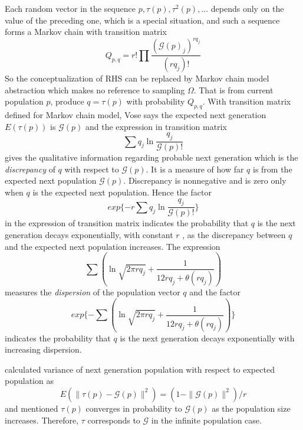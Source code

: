 Each random vector in the sequence $p, \tau(p), \tau^2(p),...$ depends only on the value of the preceding one, which is a special situation, and such a sequence forms a Markov chain with
transition matrix
\[
Q_{p,q} = r! \prod \frac{(\mathcal{G}(p)_j)^{rq_j}}{(rq_j)!}
\]
So the conceptualization of RHS can be replaced by Markov chain model abstraction which makes no reference to sampling $\Omega$. That is from current population $p$, produce $q = \tau (p)$ with probability $Q_{p,q}$. With transition matrix defined for Markov chain model, Vose \cite{Vose1999} says the expected next generation $E(\tau (p))$ is $\mathcal{G}(p)$ and the expression in transition matrix
\[
\sum q_j \ln \frac{q_j}{\mathcal{G}(p)!}
\]
gives the qualitative information regarding probable next generation which is the {\em discrepancy} of $q$ with respect to $\mathcal{G}(p)$. It is a measure of how far $q$ is from the expected next population $\mathcal{G}(p)$. Discrepancy is nonnegative and is zero only when $q$ is the expected next population. Hence the factor 
\[
exp\{-r \sum q_j \ln \frac{q_j}{\mathcal{G}(p)!}\}
\]
in the expression of transition matrix indicates the probability that $q$ is the next generation
decays exponentially, with constant $r$ , as the discrepancy between $q$ and the
expected next population increases.
The expression 
\[
\sum (\ln \sqrt{2 \pi rq_j} + \frac{1}{12rq_j + \theta (rq_j)})
\]
measures the {\em dispersion} of the population vector $q$ and the factor
\[
exp\{- \sum (\ln \sqrt{2 \pi rq_j} + \frac{1}{12rq_j + \theta (rq_j)})\}
\]
indicates the probability that $q$ is the next generation decays exponentially with increasing dispersion.

\cite{Vose1999} calculated variance of next generation population with respect to expected population as 
\[
E(\| \tau (p) - \mathcal{G}(p) \|^2) = (1 - \|\mathcal{G}(p)\|^2) / r
\]
and mentioned $\tau (p)$ converges in probability to $\mathcal{G}(p)$ as the population size increases. Therefore, $\tau$ corresponds to $\mathcal{G}$ in the infinite
population case.





